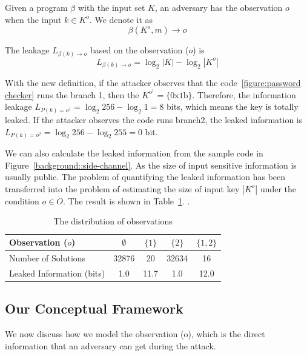 \begin{mydef}
\label{def}
Given a program $\beta$ with the input set $K$, 
an adversary has the observation $o$ when the input $k{\in}K^o$. 
We denote it as
$$\beta(K^o, m) \rightarrow	o$$

The leakage $L_{\beta(k)\rightarrow o}$ based on the observation ($o$) is
    $$L_{\beta(k)\rightarrow o} = \log_2{|K|} - \log_2{|K^o|}$$
\end{mydef}

With the new definition, if the attacker observes that the code~\ref{figure:password checker} runs the branch 1, 
then the $K^{o^{1}} = \{\mathrm{0x1b}\}$. Therefore, the information leakage $L_{P(k)=o^{1}} = \log_2{256} - \log_2{1} = 8$
bits, which means the key is totally leaked. If the attacker observes the code runs branch2, the leaked information is 
$L_{P(k)=o^{2}} = \log_2{256} - \log_2{255} = 0$ bit.


We can also calculate the leaked information
from the sample code in Figure~\ref{background::side-channel}. As the size of input 
sensitive information is usually public. The problem of quantifying the
leaked information has been transferred into the problem of estimating
the size of input key $|K^o|$ under the condition $o \in O$.
The result is shown in Table~\ref{shtable2}. .

\begin{table}[ht]
    \centering
\caption{The distribution of observations}
\label{shtable2}
\begin{tabular}{l|cccc}
    \hline
Observation ($o$)  & $\emptyset$ & ${\{1\}}$ & ${\{2\}}$ & ${\{1, 2\}}$ \\ \hline
Number of Solutions &  32876 & 20 & 32634 & 16 \\ \hline
Leaked Information (bits)     & 1.0 & 11.7 & 1.0  & 12.0   \\
    \hline
\end{tabular}
\end{table}

\subsection{Our Conceptual Framework}
\label{side-channel:condition}
We now discuss how we model the observation (o), which is the direct information
that an adversary can get during the attack.

